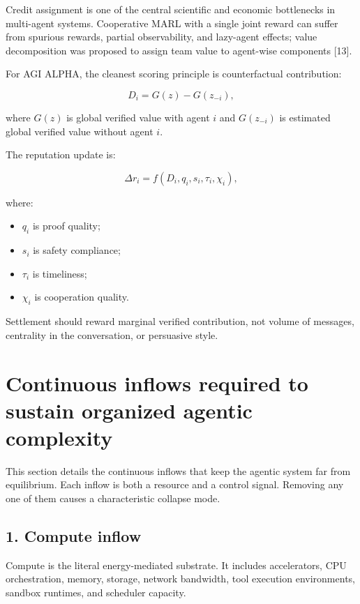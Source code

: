 \documentclass[
  11pt,
]{article}
\providecommand{\tightlist}{%
  \setlength{\itemsep}{0pt}\setlength{\parskip}{0pt}}
\begin{document}
Credit assignment is one of the central scientific and economic
bottlenecks in multi-agent systems. Cooperative MARL with a single joint
reward can suffer from spurious rewards, partial observability, and
lazy-agent effects; value decomposition was proposed to assign team
value to agent-wise components {[}13{]}.

For AGI ALPHA, the cleanest scoring principle is counterfactual
contribution:

\[
D_i=G(z)-G(z_{-i}),
\]

where \(G(z)\) is global verified value with agent \(i\) and
\(G(z_{-i})\) is estimated global verified value without agent \(i\).

The reputation update is:

\[
\Delta r_i=f(D_i,q_i,s_i,\tau_i,\chi_i),
\]

where:

\begin{itemize}
\tightlist
\item
  \(q_i\) is proof quality;
\item
  \(s_i\) is safety compliance;
\item
  \(\tau_i\) is timeliness;
\item
  \(\chi_i\) is cooperation quality.
\end{itemize}

Settlement should reward marginal verified contribution, not volume of
messages, centrality in the conversation, or persuasive style.

\section{Continuous inflows required to sustain organized agentic
complexity}\label{continuous-inflows-required-to-sustain-organized-agentic-complexity}

This section details the continuous inflows that keep the agentic system
far from equilibrium. Each inflow is both a resource and a control
signal. Removing any one of them causes a characteristic collapse mode.

\subsection{1. Compute inflow}\label{compute-inflow}

Compute is the literal energy-mediated substrate. It includes
accelerators, CPU orchestration, memory, storage, network bandwidth,
tool execution environments, sandbox runtimes, and scheduler capacity.
\end{document}
